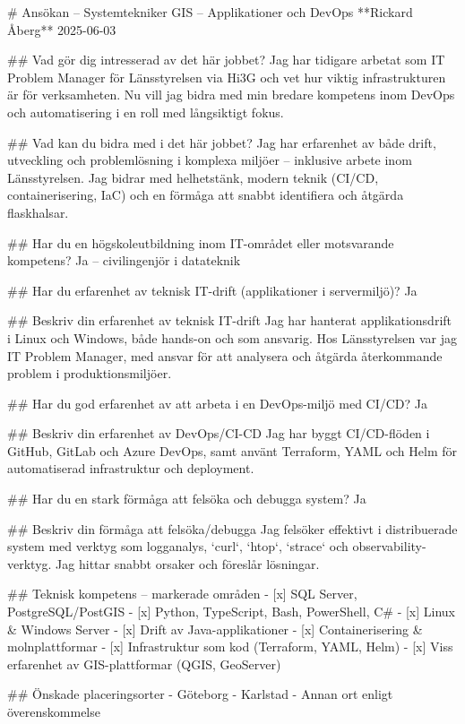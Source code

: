 # Ansökan – Systemtekniker GIS – Applikationer och DevOps  
**Rickard Åberg**  
2025-06-03  

## Vad gör dig intresserad av det här jobbet?  
Jag har tidigare arbetat som IT Problem Manager för Länsstyrelsen via Hi3G och vet hur viktig infrastrukturen är för verksamheten. Nu vill jag bidra med min bredare kompetens inom DevOps och automatisering i en roll med långsiktigt fokus.

## Vad kan du bidra med i det här jobbet?  
Jag har erfarenhet av både drift, utveckling och problemlösning i komplexa miljöer – inklusive arbete inom Länsstyrelsen. Jag bidrar med helhetstänk, modern teknik (CI/CD, containerisering, IaC) och en förmåga att snabbt identifiera och åtgärda flaskhalsar.

## Har du en högskoleutbildning inom IT-området eller motsvarande kompetens?  
Ja – civilingenjör i datateknik

## Har du erfarenhet av teknisk IT-drift (applikationer i servermiljö)?  
Ja

## Beskriv din erfarenhet av teknisk IT-drift  
Jag har hanterat applikationsdrift i Linux och Windows, både hands-on och som ansvarig. Hos Länsstyrelsen var jag IT Problem Manager, med ansvar för att analysera och åtgärda återkommande problem i produktionsmiljöer.

## Har du god erfarenhet av att arbeta i en DevOps-miljö med CI/CD?  
Ja

## Beskriv din erfarenhet av DevOps/CI-CD  
Jag har byggt CI/CD-flöden i GitHub, GitLab och Azure DevOps, samt använt Terraform, YAML och Helm för automatiserad infrastruktur och deployment.

## Har du en stark förmåga att felsöka och debugga system?  
Ja

## Beskriv din förmåga att felsöka/debugga  
Jag felsöker effektivt i distribuerade system med verktyg som logganalys, `curl`, `htop`, `strace` och observability-verktyg. Jag hittar snabbt orsaker och föreslår lösningar.

## Teknisk kompetens – markerade områden  
- [x] SQL Server, PostgreSQL/PostGIS  
- [x] Python, TypeScript, Bash, PowerShell, C#  
- [x] Linux & Windows Server  
- [x] Drift av Java-applikationer  
- [x] Containerisering & molnplattformar  
- [x] Infrastruktur som kod (Terraform, YAML, Helm)  
- [x] Viss erfarenhet av GIS-plattformar (QGIS, GeoServer)

## Önskade placeringsorter  
- Göteborg  
- Karlstad  
- Annan ort enligt överenskommelse  
